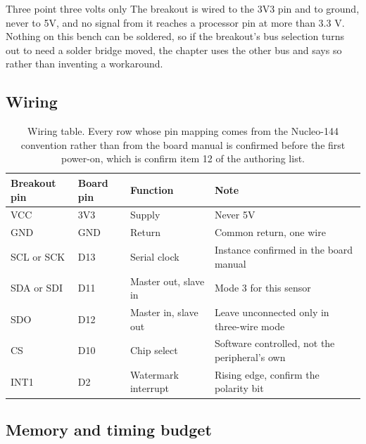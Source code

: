 \begin{note}{Three point three volts only}
The breakout is wired to the 3V3 pin and to ground, never to 5V, and no signal
from it reaches a processor pin at more than 3.3 V. Nothing on this bench can
be soldered, so if the breakout's bus selection turns out to need a solder
bridge moved, the chapter uses the other bus and says so rather than inventing
a workaround.
\end{note}

\subsection*{Wiring}


\begin{table}[H]\centering\small
\begin{tabular}{p{34mm}p{34mm}p{44mm}p{40mm}}
\toprule
Breakout pin & Board pin & Function & Note \\
\midrule
VCC & 3V3 & Supply & Never 5V \\
GND & GND & Return & Common return, one wire \\
SCL or SCK & D13 & Serial clock & Instance confirmed in the board manual \\
SDA or SDI & D11 & Master out, slave in & Mode 3 for this sensor \\
SDO & D12 & Master in, slave out & Leave unconnected only in three-wire mode \\
CS & D10 & Chip select & Software controlled, not the peripheral's own \\
INT1 & D2 & Watermark interrupt & Rising edge, confirm the polarity bit \\
\bottomrule
\end{tabular}
\caption{Wiring table. Every row whose pin mapping comes from the Nucleo-144 convention rather than from the board manual is confirmed before the first power-on, which is confirm item 12 of the authoring list.}
\end{table}

\subsection*{Memory and timing budget}


